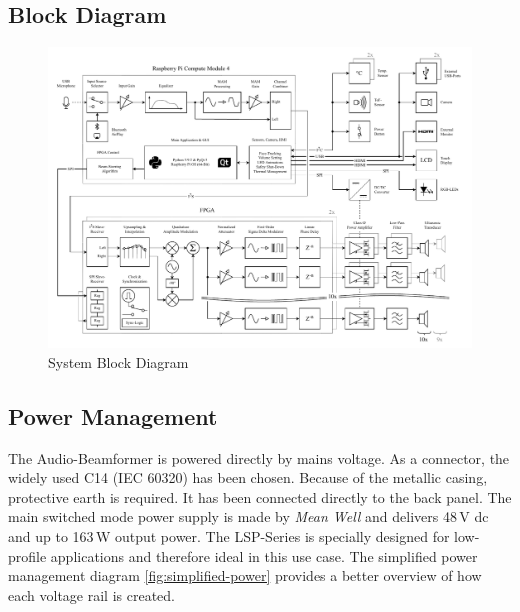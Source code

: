 \subsection{Block Diagram}
\begin{figure}[h!]
	\centering
	\includegraphics[width=21.5cm, angle=90]{images/4_Design/Hardware/System Block Diagram 2.pdf}
	\vspace{-0.2cm}
    \caption{System Block Diagram}
    \label{fig:hardware-block-diagram}
\end{figure}

\clearpage
\subsection{Power Management}
The Audio-Beamformer is powered directly by mains voltage. As a connector, the widely used C14 (IEC 60320) has been chosen. Because of the metallic casing, protective earth is required. It has been connected directly to the back panel. The main switched mode power supply is made by \textit{Mean Well} and delivers 48\,V \acrshort{dc} and up to 163\,W output power. The LSP-Series is specially designed for low-profile applications and therefore ideal in this use case.\newline
The simplified power management diagram \ref{fig:simplified-power} provides a better overview of how each voltage rail is created.

